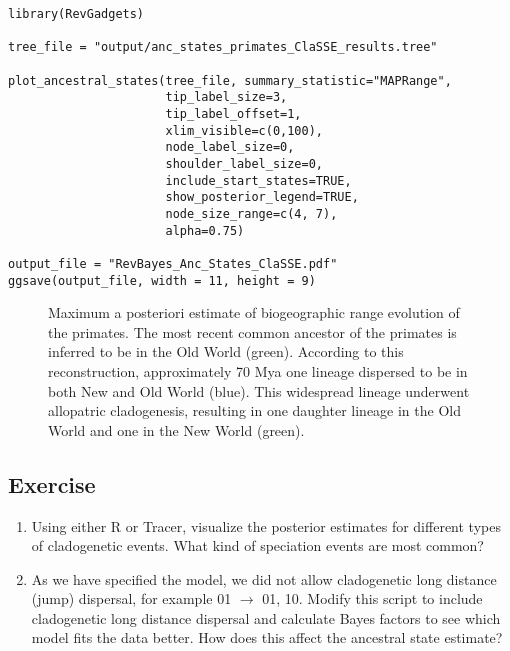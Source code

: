 {\tt \begin{snugshade*}
\begin{lstlisting}
library(RevGadgets)

tree_file = "output/anc_states_primates_ClaSSE_results.tree"

plot_ancestral_states(tree_file, summary_statistic="MAPRange",
                      tip_label_size=3,
                      tip_label_offset=1,
                      xlim_visible=c(0,100),
                      node_label_size=0,
                      shoulder_label_size=0,
                      include_start_states=TRUE,
                      show_posterior_legend=TRUE,
                      node_size_range=c(4, 7),
                      alpha=0.75)

output_file = "RevBayes_Anc_States_ClaSSE.pdf"
ggsave(output_file, width = 11, height = 9)
\end{lstlisting}
\end{snugshade*}}

\begin{figure}[h!]
\centering
{}
\caption{\small Maximum a posteriori estimate of biogeographic range evolution of the primates. 
    The most recent common ancestor of the primates is inferred to be in the Old World (green).
    According to this reconstruction, approximately 70 Mya one lineage dispersed to be in both New and Old World (blue).
    This widespread lineage underwent allopatric cladogenesis, resulting in one
    daughter lineage in the Old World and one in the New World (green).}
\label{fig:results_ClaSSE}
\end{figure}

\subsection{Exercise}

\begin{enumerate}
\item Using either R or Tracer, visualize the posterior estimates for different types of cladogenetic events. 
    What kind of speciation events are most common?
\item As we have specified the model, we did not allow cladogenetic long
    distance (jump) dispersal, for example 01 $\rightarrow$ 01, 10.
    Modify this script to include cladogenetic 
    long distance dispersal and calculate Bayes factors to see which model fits the data better.
    How does this affect the ancestral state estimate?
\end{enumerate}

\newpage


